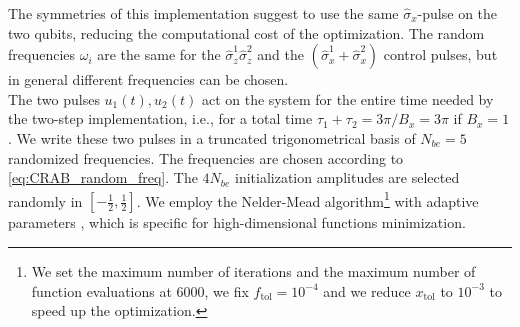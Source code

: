 \documentclass[../main/main.tex]{subfiles}
\begin{document}
The symmetries of this implementation suggest to use the same $\hat{\sigma}_x$-pulse on the two qubits, reducing the computational cost of the optimization. The random frequencies $\omega_i$ are the same for the $\hat{\sigma}_z^1 \hat{\sigma}_z^2$ and the $\left( \hat{\sigma}_x^1 + \hat{\sigma}_x^2 \right)$ control pulses, but in general different frequencies can be chosen.\\
The two pulses $u_1(t),u_2(t)$ act on the system for the entire time needed by the two-step implementation, i.e., for a total time \mbox{$\tau_1 + \tau_2 = 3\pi/B_x = 3\pi$} if $B_x=1$. We write these two pulses in a truncated trigonometrical basis of $N_{be}=5$ randomized frequencies. The frequencies are chosen according to \eqref{eq:CRAB_random_freq}. The $4 N_{be}$ initialization amplitudes are selected randomly in $\left[ -\frac{1}{2},\frac{1}{2} \right]$. We employ the Nelder-Mead algorithm\footnote{We set the maximum number of iterations and the maximum number of function evaluations at $6000$, we fix $f_{\text{tol}}=10^{-4}$ and we reduce $x_{\text{tol}}$ to $10^{-3}$ to speed up the optimization.} with adaptive parameters \cite{nelder_mead_algorithm,Gao2012}, which is specific for high-dimensional functions minimization. \par
\end{document}
